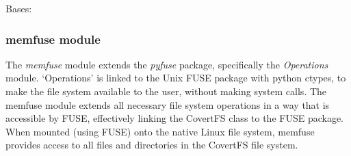 \documentclass[letterpaper,12pt,openany,oneside]{sphinxmanual}
\begin{document}
\begin{fulllineitems}
\label{File_System:covertFS.File_System.covertfs.CovertFile}
Bases: 

\end{fulllineitems}



\subsubsection{memfuse module}
\label{File_System:module-covertFS.File_System.memfuse}\label{File_System:memfuse-module}
The \emph{memfuse} module extends the \emph{pyfuse} package, specifically the
\emph{Operations} module.
`Operations' is linked to the Unix FUSE package with python ctypes, to make the
file system available to the user, without making system calls. The memfuse
module extends all necessary file system operations in a way that is accessible
by FUSE, effectively linking the CovertFS class to the FUSE package. When
mounted (using FUSE) onto the native Linux file system, memfuse provides access
to all files and directories in the CovertFS file system.
\end{document}
